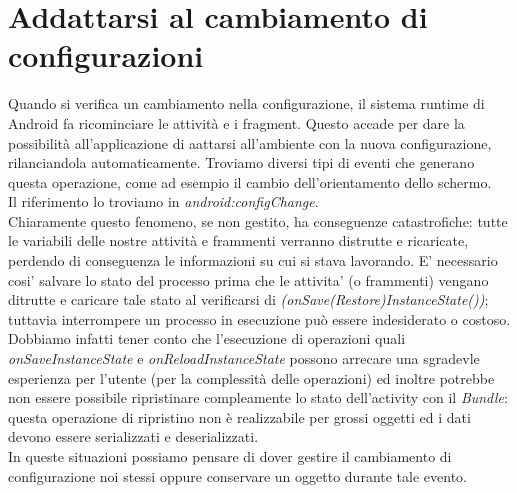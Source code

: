 %

% 


\chapter{Addattarsi al cambiamento di configurazioni}
Quando si verifica un cambiamento nella configurazione, il sistema runtime di
Android fa ricominciare le attività e i fragment. Questo accade per dare la
possibilità all'applicazione di aattarsi all'ambiente con la nuova
configurazione, rilanciandola automaticamente. Troviamo diversi tipi di eventi
che generano questa operazione, come ad esempio il cambio dell'orientamento
dello schermo.\\
Il riferimento lo troviamo in \textit{android:configChange}.\\
Chiaramente questo fenomeno, se non gestito, ha conseguenze catastrofiche: tutte
le variabili delle nostre attività e frammenti verranno distrutte e ricaricate,
perdendo di conseguenza le informazioni su cui si stava lavorando. E' necessario
cosi' salvare lo stato del processo prima che le attivita' (o frammenti) vengano
ditrutte e caricare tale stato al verificarsi di
\textit{(onSave(Restore)InstanceState())}; tuttavia interrompere un processo in
esecuzione può essere indesiderato o costoso.\\
Dobbiamo infatti tener conto che l'esecuzione di operazioni quali
\textit{onSaveInstanceState} e \textit{onReloadInstanceState} possono arrecare
una sgradevle esperienza per l'utente (per la complessità delle operazioni) ed
inoltre potrebbe non essere possibile ripristinare compleamente lo stato
dell'activity con il \textit{Bundle}: questa operazione di ripristino non è
realizzabile per grossi oggetti ed i dati devono essere serializzati e
deserializzati.\\
In queste situazioni possiamo pensare di dover gestire il cambiamento di
configurazione noi stessi oppure conservare un oggetto durante tale evento.
